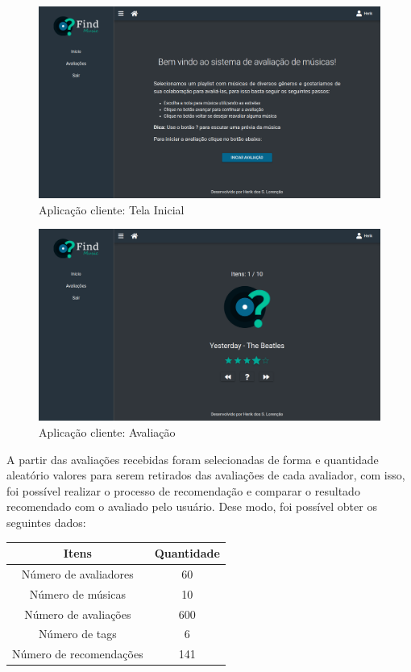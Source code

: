 \begin{figure}[H]
	\centering
	\includegraphics[width=.7\linewidth]{imagens/findmusicInicio.png}
	\caption[Aplicação cliente: Tela Inicial]{Aplicação cliente: Tela Inicial}
    \label{fig:findmusicInicio}
\end{figure}

\begin{figure}[H]
	\centering
	\includegraphics[width=.7\linewidth]{imagens/findmusicAvaliacao.png}
	\caption[Aplicação cliente: Avaliação]{Aplicação cliente: Avaliação}
    \label{fig:findmusicAvaliacao}
\end{figure}

A partir das avaliações recebidas foram selecionadas de forma e quantidade aleatório valores para serem retirados das avaliações de cada avaliador, com isso, foi possível realizar o processo de recomendação e comparar o resultado recomendado com o avaliado pelo usuário. Dese modo, foi possível obter os seguintes dados:

\begin{table}[H]
\centering
\begin{tabular}{|c|c|}
\hline
\textbf{Itens}          & \textbf{Quantidade} \\ \hline
Número de avaliadores   & 60                  \\ \hline
Número de músicas       & 10                  \\ \hline
Número de avaliações    & 600                 \\ \hline
Número de tags          & 6                   \\ \hline
Número de recomendações & 141                  \\ \hline
\end{tabular}
\label{table:resultadosEstudoCasoEdu} 
\end{table}


